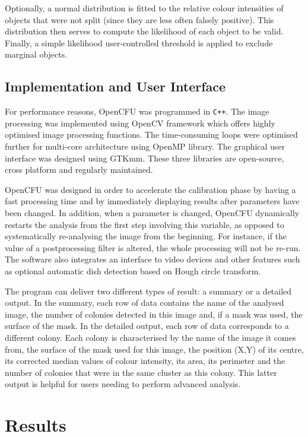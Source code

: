 \documentclass[10pt]{article}
\begin{document}
Optionally, a normal distribution is fitted to the relative colour intensities of
objects that were not split (since they are less often falsely positive). This
distribution then serves to compute the likelihood of each object to be valid.
Finally, a simple likelihood user-controlled threshold is applied to exclude
marginal objects.


 \subsection*{Implementation and User Interface} For performance reasons, OpenCFU was
programmed in \texttt{C++}. The image processing was implemented using OpenCV framework\cite{opencv_library}
 which offers highly optimised image processing functions.
The time-consuming loops were optimised further for multi-core architecture using
OpenMP library\cite{openmp11}. The graphical user interface was designed using GTKmm.
These three libraries are open-source, cross platform and regularly maintained.

OpenCFU was designed in order to accelerate the calibration phase by having a
fast processing time and by immediately displaying results after parameters have
been changed. In addition, when a parameter is changed, OpenCFU dynamically restarts the analysis from
the first step involving this variable, as opposed to systematically re-analysing the image
from 
the beginning. For instance, if the value of a postprocessing filter is altered, the whole processing will not be re-run.
The software also integrates an interface to video
devices and
other features such as optional
automatic dish detection based on Hough circle transform.


The program can deliver two different types of result: a summary or a detailed 
output. In the summary, each row of data contains
the name of the analysed image, the number of 
colonies
detected in this image and, if a mask was used, the surface of the mask.
In the detailed output, each row of data corresponds to a different colony. 
Each colony is characterised by the name of the image it comes from,
the surface of the mask used for this image,
the position (X,Y) of its centre, its corrected median values of colour intensity,
its area, its perimeter and the number of colonies that were in the same cluster 
as
this colony. This latter output is helpful for users needing
to perform advanced analysis.


\section*{Results}
\end{document}
